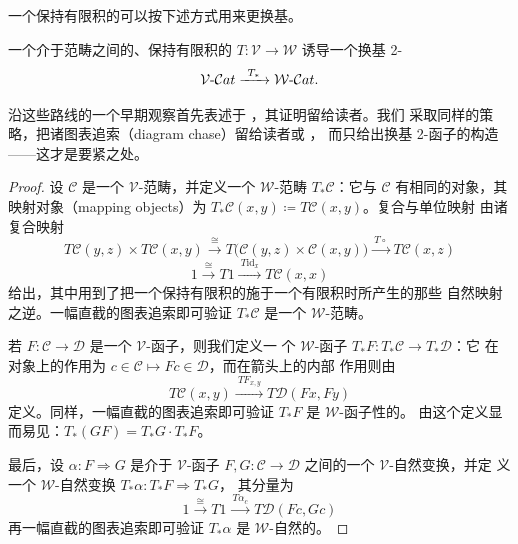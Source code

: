一个保持有限积的\trFunctor{}可以按下述方式用来更换基。

\begin{proposition}\label{prop:change-of-base-2-functor}
一个介于\trCartesianClosed{}范畴之间的、保持有限积的\trFunctor{}
$T\colon\mathcal{V}\to\mathcal{W}$ 诱导一个换基 2-\trFunctor
\[ \mathcal{V}\text{-}\Cat\xrightarrow{\ T_{*}\ }\mathcal{W}\text{-}\Cat. \]
\end{proposition}

沿这些路线的一个早期观察首先表述于 \cite[II.6.3]{bib41}，其证明留给读者。我们
采取同样的策略，把诸图表追索（diagram chase）留给读者或 \cite[4.2.4]{bib31}，
而只给出换基 2-函子的构造——这才是要紧之处。

\begin{proof}
设 $\mathcal{C}$ 是一个 $\mathcal{V}$-范畴，并定义一个 $\mathcal{W}$-范畴
$T_{*}\mathcal{C}$：它与 $\mathcal{C}$ 有相同的对象，其映射对象（mapping
objects）为 $T_{*}\mathcal{C}(x,y)\coloneqq T\mathcal{C}(x,y)$。复合与单位映射
由诸复合映射
\[ T\mathcal{C}(y,z)\times T\mathcal{C}(x,y)
   \xrightarrow{\ \cong\ }
   T\bigl(\mathcal{C}(y,z)\times\mathcal{C}(x,y)\bigr)
   \xrightarrow{\ T\circ\ }T\mathcal{C}(x,z) \]
\[ 1\xrightarrow{\ \cong\ }T1\xrightarrow{\ T\mathrm{id}_{x}\ }T\mathcal{C}(x,x) \]
给出，其中用到了把一个保持有限积的\trFunctor{}施于一个有限积时所产生的那些
自然映射之逆。一幅直截的图表追索即可验证 $T_{*}\mathcal{C}$ 是一个
$\mathcal{W}$-范畴。

若 $F\colon\mathcal{C}\to\mathcal{D}$ 是一个 $\mathcal{V}$-函子，则我们定义一
个 $\mathcal{W}$-函子 $T_{*}F\colon T_{*}\mathcal{C}\to T_{*}\mathcal{D}$：它
在对象上的作用为 $c\in\mathcal{C}\mapsto Fc\in\mathcal{D}$，而在箭头上的内部
作用则由
\[ T\mathcal{C}(x,y)\xrightarrow{\ TF_{x,y}\ }T\mathcal{D}(Fx,Fy) \]
定义。同样，一幅直截的图表追索即可验证 $T_{*}F$ 是 $\mathcal{W}$-函子性的。
由这个定义显而易见：$T_{*}(GF)=T_{*}G\cdot T_{*}F$。

最后，设 $\alpha\colon F\Rightarrow G$ 是介于 $\mathcal{V}$-函子
$F,G\colon\mathcal{C}\to\mathcal{D}$ 之间的一个 $\mathcal{V}$-自然变换，并定
义一个 $\mathcal{W}$-自然变换 $T_{*}\alpha\colon T_{*}F\Rightarrow T_{*}G$，
其分量为
\[ 1\xrightarrow{\ \cong\ }T1\xrightarrow{\ T\alpha_{c}\ }T\mathcal{D}(Fc,Gc) \]
再一幅直截的图表追索即可验证 $T_{*}\alpha$ 是 $\mathcal{W}$-自然的。


\end{proof}
